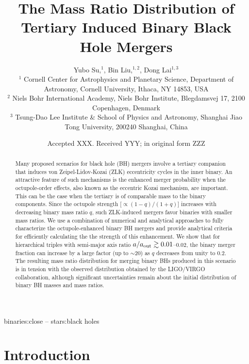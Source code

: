 \documentclass[
        fleqn,
        usenatbib,
    ]{mnras}
\title[Mass Ratio Distribution]{The Mass Ratio Distribution of
Tertiary Induced Binary Black Hole Mergers}
\author[Y. Su et\ al.]{
Yubo Su,$^1$,
Bin Liu,$^{1,2}$,
Dong Lai$^{1,3}$
\\
$^1$ Cornell Center for Astrophysics and Planetary Science, Department of
Astronomy, Cornell University, Ithaca, NY 14853, USA\\
$^2$ Niels Bohr International Academy, Niels Bohr Institute, Blegdamsvej 17,
2100 Copenhagen, Denmark\\
$^3$ Tsung-Dao Lee Institute \& School of Physics and Astronomy, Shanghai Jiao
Tong University, 200240 Shanghai, China
}
\date{Accepted XXX\@. Received YYY\@; in original form ZZZ}
\begin{document}
\label{firstpage}
\pagerange{\pageref{firstpage}--\pageref{lastpage}}
\maketitle

\begin{abstract}
    Many proposed scenarios for black hole (BH) mergers involve a tertiary
    companion that induces von Zeipel-Lidov-Kozai (ZLK) eccentricity cycles in
    the inner binary. An attractive feature of such mechanisms is the enhanced
    merger probability when the octupole-order effects, also known as the
    eccentric Kozai mechanism, are important. This can be the case when the
    tertiary is of comparable mass to the binary components. Since the octupole
    strength [$\propto (1-q)/(1+q)$] increases with decreasing binary mass ratio
    $q$, such ZLK-induced mergers favor binaries with smaller mass ratios. We
    use a combination of numerical and analytical approaches to fully
    characterize the octupole-enhanced binary BH mergers and provide analytical
    criteria for efficiently calculating the the strength of this enhancement.
    We show that for hierarchical triples with semi-major axis ratio $a/a_{\rm
    out}\gtrsim 0.01$--$0.02$, the binary merger fraction can increase by a
    large factor (up to $\sim 20$) as $q$ decreases from unity to $0.2$. The
    resulting mass ratio distribution for merging binary BHs produced in this
    scenario is in tension with the observed distribution obtained by the
    LIGO/VIRGO collaboration, although significant uncertainties remain about
    the initial distribution of binary BH masses and mass ratios.
\end{abstract}

\begin{keywords}
binaries:close -- stars:black holes %
\end{keywords}

\section{Introduction}\label{s:intro}
\end{document}
